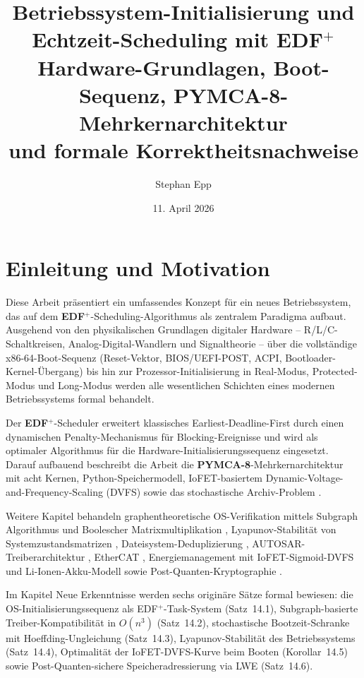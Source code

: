 ﻿\documentclass[a4paper,12pt]{scrreprt}
\title{%
	\textbf{Betriebssystem-Initialisierung und\\
		Echtzeit-Scheduling mit EDF$^+$}\\[0.4em]
	\large Hardware-Grundlagen, Boot-Sequenz, PYMCA-8-Mehrkernarchitektur\\
	und formale Korrektheitsnachweise
}
\author{Stephan Epp}
\date{11. April 2026}
\theoremstyle{definition}
\begin{document}
	
	\maketitle
	\tableofcontents
	\newpage
	
	\chapter{Einleitung und Motivation}
	
	Diese Arbeit präsentiert ein umfassendes Konzept für ein neues Betriebssystem, das
	auf dem \textbf{EDF$^+$}-Scheduling-Algorithmus \cite{Epp2026edfplus} als zentralem
	Paradigma aufbaut. Ausgehend von den physikalischen Grundlagen digitaler Hardware --
	R/L/C-Schaltkreisen, Analog-Digital-Wandlern und Signaltheorie -- über die
	vollständige x86-64-Boot-Sequenz (Reset-Vektor, BIOS/UEFI-POST, ACPI,
	Bootloader-Kernel-Übergang) bis hin zur Prozessor-Initialisierung in
	Real-Modus, Protected-Modus und Long-Modus werden alle wesentlichen Schichten
	eines modernen Betriebssystems formal behandelt.
	
	Der \textbf{EDF$^+$}-Scheduler erweitert klassisches Earliest-Deadline-First
	durch einen dynamischen Penalty-Mechanismus für Blocking-Ereignisse und
	wird als optimaler Algorithmus für die Hardware-Initialisierungssequenz
	eingesetzt. Darauf aufbauend beschreibt die Arbeit die
	\textbf{PYMCA-8}-Mehrkernarchitektur \cite{Epp2026pymca8} mit acht Kernen,
	Python-Speichermodell, IoFET-basiertem Dynamic-Voltage-and-Frequency-Scaling
	(DVFS) sowie das stochastische Archiv-Problem \cite{Epp2026archv}.
	
	Weitere Kapitel behandeln graphentheoretische OS-Verifikation mittels
	Subgraph Algorithmus \cite{Epp2026subgraph} und Boolescher Matrixmultiplikation
	\cite{Epp2026boolmm}, Lyapunov-Stabilität von Systemzustandsmatrizen
	\cite{Epp2026sysstate}, Dateisystem-Deduplizierung \cite{Epp2026dusgraph},
	AUTOSAR-Treiber\-architektur \cite{Epp2026autsre}, EtherCAT \cite{Epp2026ethercate},
	Energiemanagement mit IoFET-Sigmoid-DVFS und Li-Ionen-Akku-Modell
	\cite{Epp2026liionp,Epp2026iono} sowie Post-Quanten-Kryptographie
	\cite{Epp2026pqc}.
	
	Im Kapitel Neue Erkenntnisse werden sechs originäre Sätze formal bewiesen:
	die OS-Initialisierungssequenz als EDF$^+$-Task-System (Satz~14.1),
	Subgraph-basierte Treiber-Kompatibilität in $O(n^3)$ (Satz~14.2),
	stochastische Bootzeit-Schranke mit Hoeffding-Ungleichung (Satz~14.3),
	Lyapunov-Stabilität des Betriebssystems (Satz~14.4),
	Optimalität der IoFET-DVFS-Kurve beim Booten (Korollar~14.5) sowie
	Post-Quanten-sichere Speicheradressierung via LWE (Satz~14.6).
	
\end{document}
